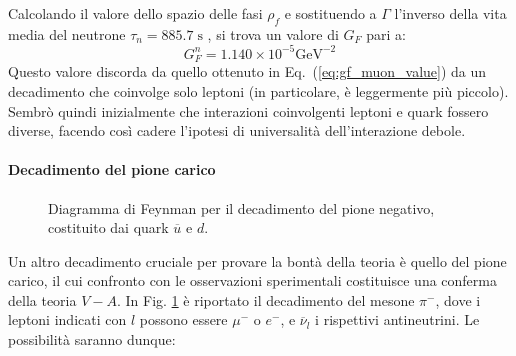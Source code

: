 \documentclass{subnucbo}
\begin{document}
Calcolando il valore dello spazio delle fasi $\rho_{f}$ e sostituendo a $\Gamma$ l'inverso della vita media del neutrone $\tau_{n}=885.7\; \mathrm{s}$ , si trova un valore di $G_{F}$ pari a:
\begin{equation}
        G^{n} _ { F } = 1.140 \times 10 ^ { - 5 } \mathrm { GeV } ^ { - 2 }
        \label{eq:gf_neutron_value}
\end{equation}
Questo valore discorda da quello ottenuto in Eq.~(\ref{eq:gf_muon_value}) da un decadimento che coinvolge solo leptoni (in particolare, è leggermente più piccolo). Sembrò quindi inizialmente che interazioni coinvolgenti leptoni e quark fossero diverse, facendo così cadere l'ipotesi di universalità dell'interazione debole.

\paragraph{Decadimento del pione carico}
\begin{figure}[!h]
        \centering
        \caption{Diagramma di Feynman per il decadimento del pione negativo, costituito dai quark $\overline{u}$ e $d$.}
        \label{fig:pion_decay}
\end{figure}
Un altro decadimento cruciale per provare la bontà della teoria è quello del pione carico, il cui confronto con le osservazioni sperimentali costituisce una conferma della teoria $V-A$. In Fig. \ref{fig:pion_decay} è riportato il decadimento del mesone $\pi^{-}$, dove i leptoni indicati con $l$ possono essere $\mu^{-}$ o $e^{-}$, e $\overline{\nu}_{l}$ i rispettivi antineutrini. Le possibilità saranno dunque:
\end{document}
